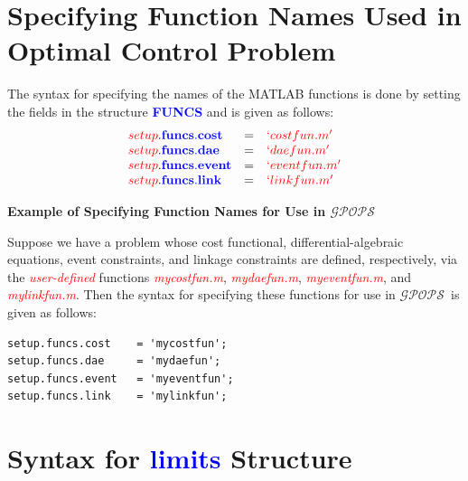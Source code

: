 \documentclass[10pt,final]{report}
\newcommand{\gpops}{$\mathcal{GPOPS}$~}
\newenvironment{shadedframe}{%
  \def\FrameCommand{\fcolorbox{black}{shadecolor}}%
  \MakeFramed {\FrameRestore}}
{\endMakeFramed}
\newcommand{\bfblue}[1]{\textcolor{blue}{\bf #1}}
\newcommand{\slred}[1]{\textcolor{red}{\sl #1}}
\begin{document}
\section{Specifying Function Names Used in Optimal Control Problem}\label{sect:_Func_Names}

The syntax for specifying the names of the MATLAB functions is done by
setting the fields in the structure \bfblue{FUNCS} and is given as follows:
\begin{displaymath}
  \begin{array}{lcl}
    \slred{setup}.\bfblue{funcs.cost} & = & \slred{`costfun.m'} \\
    \slred{setup}.\bfblue{funcs.dae} & = & \slred{`daefun.m'} \\
    \slred{setup}.\bfblue{funcs.event} & = & \slred{`eventfun.m'} \\
    \slred{setup}.\bfblue{funcs.link} & = & \slred{`linkfun.m'}
  \end{array}
\end{displaymath}

\begin{shadedframe}

{\noindent}{\bf Example of Specifying Function Names for Use in \gpops}

\vspace{12pt}

{\noindent}Suppose we have a problem whose cost functional,
differential-algebraic equations, event constraints,
and linkage constraints are defined, respectively, via the
\slred{user-defined} functions \slred{mycostfun.m},
\slred{mydaefun.m}, \slred{myeventfun.m}, and
\slred{mylinkfun.m}.  Then the syntax for specifying these functions
for use in \gpops is given as follows:
\begin{verbatim}
setup.funcs.cost    = 'mycostfun';
setup.funcs.dae     = 'mydaefun';
setup.funcs.event   = 'myeventfun';
setup.funcs.link    = 'mylinkfun';
\end{verbatim}

\end{shadedframe}


\section{Syntax for \bfblue{limits} Structure \label{sect: limits}}
\end{document}

